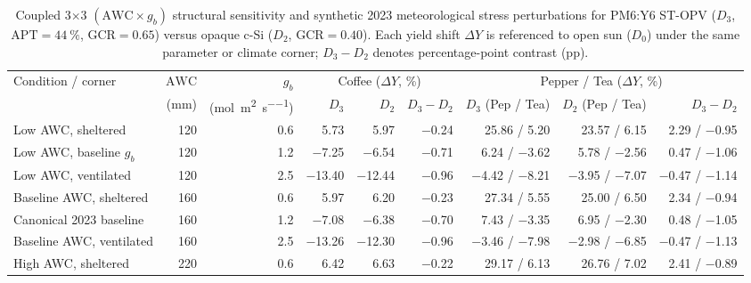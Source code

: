 \documentclass[preprint,12pt,a4paper]{elsarticle}
\begin{document}
\begin{table}[htbp]
\centering
\scriptsize
\setlength{\tabcolsep}{2.8pt}
\caption{Coupled \num{3}$\times$\num{3} $(\mathrm{AWC}\times g_b)$ structural sensitivity and synthetic 2023 meteorological stress perturbations for PM6:Y6 ST-OPV ($D_3$, $\mathrm{APT}=\qty{44}{\percent}$, $\mathrm{GCR}=\num{0.65}$) versus opaque c-Si ($D_2$, $\mathrm{GCR}=\num{0.40}$). Each yield shift $\Delta Y$ is referenced to open sun ($D_0$) under the same parameter or climate corner; $D_3-D_2$ denotes percentage-point contrast (\unit{pp}).}
\label{tab:sm_awc_gb_stress}
\begin{tabular}{@{}l r r rrr rrr@{}}
\toprule
Condition / corner & $\mathrm{AWC}$ & $g_b$ & \multicolumn{3}{c}{Coffee ($\Delta Y$, \unit{\percent})} & \multicolumn{3}{c}{Pepper / Tea ($\Delta Y$, \unit{\percent})} \\
\cmidrule(lr){4-6}\cmidrule(lr){7-9}
& (\unit{\milli\meter}) & (\unit{\mole\per\square\meter\per\second}) & $D_3$ & $D_2$ & $D_3-D_2$ & $D_3$ (Pep / Tea) & $D_2$ (Pep / Tea) & $D_3-D_2$ \\
\midrule
Low AWC, sheltered & \num{120} & \num{0.6} & \num{+5.73} & \num{+5.97} & \num{-0.24} & \num{+25.86} / \num{+5.20} & \num{+23.57} / \num{+6.15} & \num{+2.29} / \num{-0.95} \\
Low AWC, baseline $g_b$ & \num{120} & \num{1.2} & \num{-7.25} & \num{-6.54} & \num{-0.71} & \num{+6.24} / \num{-3.62} & \num{+5.78} / \num{-2.56} & \num{+0.47} / \num{-1.06} \\
Low AWC, ventilated & \num{120} & \num{2.5} & \num{-13.40} & \num{-12.44} & \num{-0.96} & \num{-4.42} / \num{-8.21} & \num{-3.95} / \num{-7.07} & \num{-0.47} / \num{-1.14} \\
Baseline AWC, sheltered & \num{160} & \num{0.6} & \num{+5.97} & \num{+6.20} & \num{-0.23} & \num{+27.34} / \num{+5.55} & \num{+25.00} / \num{+6.50} & \num{+2.34} / \num{-0.94} \\
Canonical 2023 baseline & \num{160} & \num{1.2} & \num{-7.08} & \num{-6.38} & \num{-0.70} & \num{+7.43} / \num{-3.35} & \num{+6.95} / \num{-2.30} & \num{+0.48} / \num{-1.05} \\
Baseline AWC, ventilated & \num{160} & \num{2.5} & \num{-13.26} & \num{-12.30} & \num{-0.96} & \num{-3.46} / \num{-7.98} & \num{-2.98} / \num{-6.85} & \num{-0.47} / \num{-1.13} \\
High AWC, sheltered & \num{220} & \num{0.6} & \num{+6.42} & \num{+6.63} & \num{-0.22} & \num{+29.17} / \num{+6.13} & \num{+26.76} / \num{+7.02} & \num{+2.41} / \num{-0.89} \\

\end{tabular}
\end{table}
\end{document}
